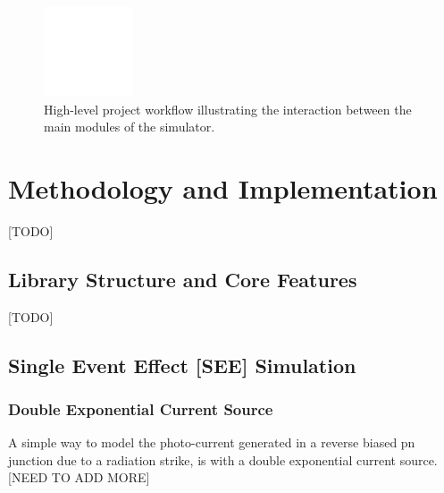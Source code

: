\documentclass[conference]{IEEEtran}
\begin{document}
    \begin{figure}[htbp]
        \centering
        \includegraphics[width=0.8\linewidth]{project_flow_diagram_placeholder}
        \caption{High-level project workflow illustrating the interaction between the main modules of the simulator.}
        \label{fig:project_flow}
    \end{figure}


    \section{Methodology and Implementation}\label{sec:methodology-and-implementation}
    [TODO]

    \subsection{Library Structure and Core Features}\label{subsec:library-structure-and-core-features}
    [TODO]

    \vspace{1em}

    \subsection{Single Event Effect [SEE] Simulation}\label{subsec:single-event-effect-[see]-simulation}

    \subsubsection{Double Exponential Current Source}
    A simple way to model the photo-current generated in a reverse biased pn junction due to a radiation strike, is with a double exponential current source.
    [NEED TO ADD MORE]
\end{document}
